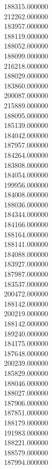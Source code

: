 188315.000000\\
212262.000000\\
183957.000000\\
188119.000000\\
188052.000000\\
188099.000000\\
216218.000000\\
188029.000000\\
183860.000000\\
200087.000000\\
215889.000000\\
188095.000000\\
185139.000000\\
184042.000000\\
187957.000000\\
184264.000000\\
183808.000000\\
184054.000000\\
199956.000000\\
184008.000000\\
188036.000000\\
184344.000000\\
184166.000000\\
188164.000000\\
188141.000000\\
184088.000000\\
183927.000000\\
187987.000000\\
183537.000000\\
200472.000000\\
188142.000000\\
200219.000000\\
188142.000000\\
189240.000000\\
184175.000000\\
187648.000000\\
200239.000000\\
185829.000000\\
188046.000000\\
188027.000000\\
187906.000000\\
187851.000000\\
188179.000000\\
191983.000000\\
188221.000000\\
188579.000000\\
187994.000000\\
